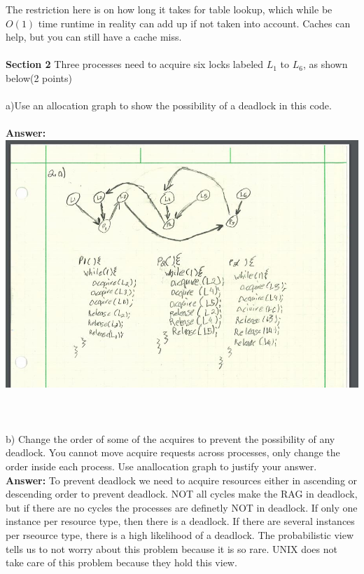\documentclass[12pt]{article}
\begin{document}
The restriction here is on how long it takes for table lookup, which while be $O(1)$ time 
runtime in reality can add up if not taken into account. Caches can help, but you can still 
have a cache miss.
\\\\ \textbf{Section 2} Three processes need to acquire six locks labeled $L_1$ 
to $L_6$, as shown below(2 points)
\\\\a)Use an allocation graph to show the possibility of a deadlock in this code.\\\\
\textbf{Answer: }\\
\includegraphics[scale = 0.6]{sec2.jpg}
\\\\
\\\\b) Change the order of some of the acquires to prevent  the possibility of any deadlock. 
You cannot move acquire requests across processes, only change the order inside each process. 
Use anallocation graph to justify your answer.\\
\textbf{Answer: }To prevent deadlock we need to acquire resources either in ascending or 
descending order to prevent deadlock. NOT all cycles make the RAG in deadlock, but if 
there are no cycles the processes are definetly NOT in deadlock. If only one instance per resource 
type, then there is a deadlock. If there are several instances per rseource type, there is a high 
likelihood of a deadlock. The probabilistic view tells us to not worry about this problem because 
it is so rare. UNIX does not take care of this problem because they hold this view.
\end{document}

